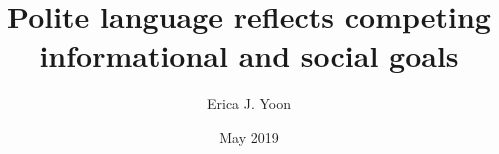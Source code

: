 \documentclass[oneside]{report}
\begin{document}
\title{Polite language reflects competing informational and social goals}
\author{Erica J. Yoon}
\date{May 2019}


\makeatletter
\def\maxwidth{ %
  \ifdim\Gin@nat@width>\linewidth
    \linewidth
  \else
    \Gin@nat@width
  \fi
}
\makeatother

\renewcommand{\contentsname}{Contents}

\setlength{\parskip}{0pt}


\providecommand{\tightlist}{%
  \setlength{\itemsep}{0pt}\setlength{\parskip}{0pt}}
\end{document}

